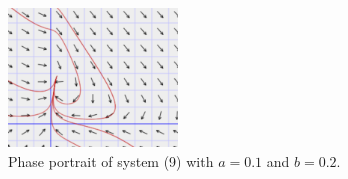 \documentclass[12pt]{report}
\begin{document}
\begin{figure}
    \centering
    \hspace*{0cm}\includegraphics[width=0.4\textwidth,height=\textwidth,keepaspectratio]{images/8-sup.PNG}
    \caption{Phase portrait of system (9) with $a=0.1$ and $b=0.2$.}
\end{figure}
\end{document}
